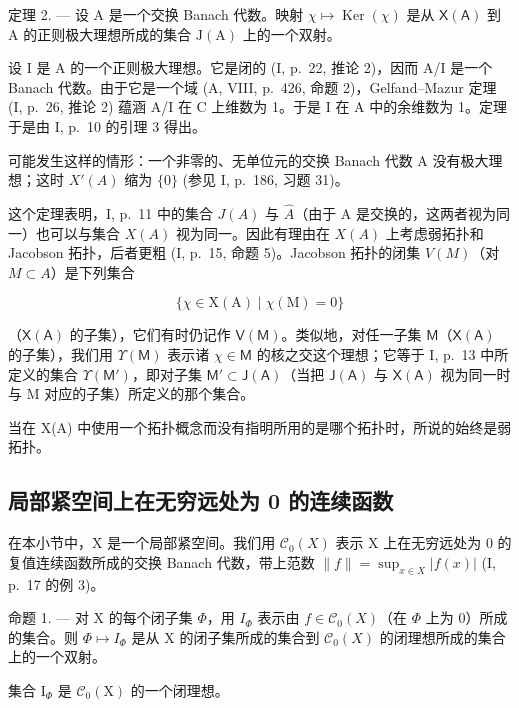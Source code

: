 定理 2. --- 设 A 是一个交换 Banach 代数。映射 \(\chi \mapsto \operatorname{Ker}(\chi)\) 是从 \(\mathsf{X}(\mathsf{A})\) 到 A 的正则极大理想所成的集合 \(\mathrm{J}(\mathrm{A})\) 上的一个双射。

设 I 是 A 的一个正则极大理想。它是闭的 (I, p.~22, 推论 2)，因而 A/I 是一个 Banach 代数。由于它是一个域 (A, VIII, p.~426, 命题 2)，Gelfand--Mazur 定理 (I, p.~26, 推论 2) 蕴涵 A/I 在 C 上维数为 1。于是 I 在 A 中的余维数为 1。定理于是由 I, p.~10 的引理 3 得出。

可能发生这样的情形：一个非零的、无单位元的交换 Banach 代数 A 没有极大理想；这时 \(X'(A)\) 缩为 \(\{0\}\) (参见 I, p.~186, 习题 31)。

这个定理表明，I, p.~11 中的集合 \(J(A)\) 与 \(\hat{A}\)（由于 A 是交换的，这两者视为同一）也可以与集合 \(X(A)\) 视为同一。因此有理由在 \(X(A)\) 上考虑弱拓扑和 Jacobson 拓扑，后者更粗 (I, p.~15, 命题 5)。Jacobson 拓扑的闭集 \(V(M)\)（对 \(M \subset A\)）是下列集合

\[
\{\chi \in \mathrm{X} (\mathrm{A}) \mid \chi (\mathrm{M}) = 0 \}
\]

（\(\mathsf{X}(\mathsf{A})\) 的子集），它们有时仍记作 \(\mathsf{V}(\mathsf{M})\)。类似地，对任一子集 \(\mathsf{M}\)（\(\mathsf{X}(\mathsf{A})\) 的子集），我们用 \(\Upsilon(\mathsf{M})\) 表示诸 \(\chi \in \mathsf{M}\) 的核之交这个理想；它等于 I, p.~13 中所定义的集合 \(\Upsilon(\mathsf{M}')\)，即对子集 \(\mathsf{M}' \subset \mathsf{J}(\mathsf{A})\)（当把 \(\mathsf{J}(\mathsf{A})\) 与 \(\mathsf{X}(\mathsf{A})\) 视为同一时与 M 对应的子集）所定义的那个集合。

当在 X(A) 中使用一个拓扑概念而没有指明所用的是哪个拓扑时，所说的始终是弱拓扑。

\subsection{局部紧空间上在无穷远处为 0 的连续函数}

在本小节中，X 是一个局部紧空间。我们用 \(\mathcal{C}_{0}(X)\) 表示 X 上在无穷远处为 0 的复值连续函数所成的交换 Banach 代数，带上范数 \(\|f\|=\sup_{x\in X}|f(x)|\) (I, p.~17 的例 3)。

命题 1. --- 对 X 的每个闭子集 \(\Phi\)，用 \(I_{\Phi}\) 表示由 \(f \in \mathcal{C}_0(X)\)（在 \(\Phi\) 上为 0）所成的集合。则 \(\Phi \mapsto I_{\Phi}\) 是从 X 的闭子集所成的集合到 \(\mathcal{C}_0(X)\) 的闭理想所成的集合上的一个双射。

集合 \(\mathrm{I}_{\Phi}\) 是 \(\mathcal{C}_0(\mathrm{X})\) 的一个闭理想。

